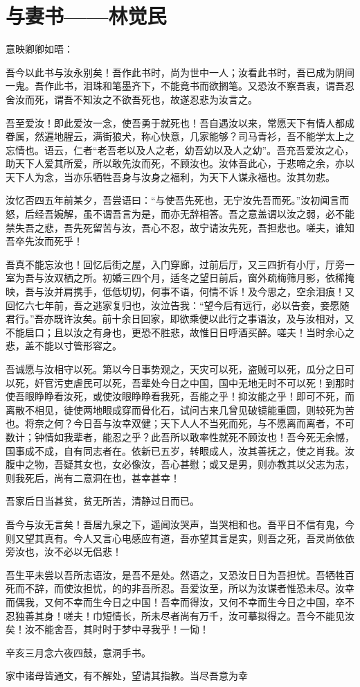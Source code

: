 \section{ 与妻书——林觉民}

意映卿卿如晤：

吾今以此书与汝永别矣！吾作此书时，尚为世中一人；汝看此书时，吾已成为阴间一鬼。吾作此书，泪珠和笔墨齐下，不能竟书而欲搁笔。又恐汝不察吾衷，谓吾忍舍汝而死，谓吾不知汝之不欲吾死也，故遂忍悲为汝言之。

吾至爱汝！即此爱汝一念，使吾勇于就死也！吾自遇汝以来，常愿天下有情人都成眷属，然遍地腥云，满街狼犬，称心快意，几家能够？司马青衫，吾不能学太上之忘情也。语云，仁者“老吾老以及人之老，幼吾幼以及人之幼”。吾充吾爱汝之心，助天下人爱其所爱，所以敢先汝而死，不顾汝也。汝体吾此心，于悲啼之余，亦以天下人为念，当亦乐牺牲吾身与汝身之福利，为天下人谋永福也。汝其勿悲。

汝忆否四五年前某夕，吾尝语曰：“与使吾先死也，无宁汝先吾而死。”汝初闻言而怒，后经吾婉解，虽不谓吾言为是，而亦无辞相答。吾之意盖谓以汝之弱，必不能禁失吾之悲，吾先死留苦与汝，吾心不忍，故宁请汝先死，吾担悲也。嗟夫，谁知吾卒先汝而死乎！

吾真不能忘汝也！回忆后街之屋，入门穿廊，过前后厅，又三四折有小厅，厅旁一室为吾与汝双栖之所。初婚三四个月，适冬之望日前后，窗外疏梅筛月影，依稀掩映，吾与汝并肩携手，低低切切，何事不语，何情不诉！及今思之，空余泪痕！又回忆六七年前，吾之逃家复归也，汝泣告我：“望今后有远行，必以告妾，妾愿随君行。”吾亦既许汝矣。前十余日回家，即欲乘便以此行之事语汝，及与汝相对，又不能启口；且以汝之有身也，更恐不胜悲，故惟日日呼酒买醉。嗟夫！当时余心之悲，盖不能以寸管形容之。

吾诚愿与汝相守以死。第以今日事势观之，天灾可以死，盗贼可以死，瓜分之日可以死，奸官污吏虐民可以死，吾辈处今日之中国，国中无地无时不可以死！到那时使吾眼睁睁看汝死，或使汝眼睁睁看我死，吾能之乎！抑汝能之乎！即可不死，而离散不相见，徒使两地眼成穿而骨化石，试问古来几曾见破镜能重圆，则较死为苦也。将奈之何？今日吾与汝幸双健；天下人人不当死而死，与不愿离而离者，不可数计；钟情如我辈者，能忍之乎？此吾所以敢率性就死不顾汝也！吾今死无余憾，国事成不成，自有同志者在。依新已五岁，转眼成人，汝其善抚之，使之肖我。汝腹中之物，吾疑其女也，女必像汝，吾心甚慰；或又是男，则亦教其以父志为志，则我死后，尚有二意洞在也，甚幸甚幸！

吾家后日当甚贫，贫无所苦，清静过日而已。

吾今与汝无言矣！吾居九泉之下，遥闻汝哭声，当哭相和也。吾平日不信有鬼，今则又望其真有。今人又言心电感应有道，吾亦望其言是实，则吾之死，吾灵尚依依旁汝也，汝不必以无侣悲！

吾生平未尝以吾所志语汝，是吾不是处。然语之，又恐汝日日为吾担忧。吾牺牲百死而不辞，而使汝担忧，的的非吾所忍。吾爱汝至，所以为汝谋者惟恐未尽。汝幸而偶我，又何不幸而生今日之中国！吾幸而得汝，又何不幸而生今日之中国，卒不忍独善其身！嗟夫！巾短情长，所未尽者尚有万千，汝可摹拟得之。吾今不能见汝矣！汝不能舍吾，其时时于梦中寻我乎！一恸！

辛亥三月念六夜四鼓，意洞手书。

家中诸母皆通文，有不解处，望请其指教。当尽吾意为幸